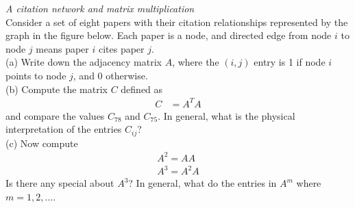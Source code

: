 \documentclass[12pt]{article}
\newenvironment{problem}[2][Problem]{\begin{trivlist}
\item[\hskip \labelsep {\bfseries #1}\hskip \labelsep {\bfseries #2.}]}{\end{trivlist}}
\begin{document}
\begin{problem}{3} \textit{A citation network and matrix multiplication}\\
	Consider a set of eight papers with their citation relationships represented by the graph in the figure below. Each paper is a node, and directed edge from node $ i $ to node $ j $ means paper $ i $ cites paper $ j $. \\
	(a) Write down the adjacency matrix $ A $, where the $ (i, j) $ entry is 1 if node $ i $ points to node $ j $, and 0 otherwise. \\
	(b) Compute the matrix $ C $ defined as 
	\begin{align*}
		C &= A^TA
	\end{align*}
	and compare the values $ C_{78}$ and $ C_{75} $. In general, what is the physical interpretation of the entries $ C_{ij} $?\\
	(c) Now compute
	\begin{align*}
		A^2 = AA \\
		A^3 = A^2A
	\end{align*}
	Is there any special about $A^3$? In general, what do the entries in $ A^m $ where $ m=1,2,\dots $.
\end{problem}
\end{document}
